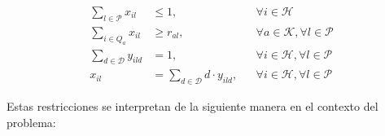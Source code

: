 \documentclass[conference]{IEEEtran}
\begin{document}
\begin{align}
    \sum_{l \in \mathcal{P}} x_{il}  & \leq 1,                                     &  & \forall i \in \mathcal{H} \label{eq:constraint_capacity_updated}                              \\
    \sum_{i \in Q_a} x_{il}          & \geq r_{al},                                &  & \forall a \in \mathcal{K}, \forall l \in \mathcal{P} \label{eq:constraint_skills_updated}     \\
    \sum_{d \in \mathcal{D}} y_{ild} & = 1,                                        &  & \forall i \in \mathcal{H}, \forall l \in \mathcal{P} \label{eq:constraint_force_one_fraction} \\
    x_{il}                           & = \sum_{d \in \mathcal{D}} d \cdot y_{ild}, &  & \forall i \in \mathcal{H}, \forall l \in \mathcal{P} \label{eq:constraint_define_x_from_y}
\end{align}

Estas restricciones se interpretan de la siguiente manera en el contexto del problema:
\end{document}
